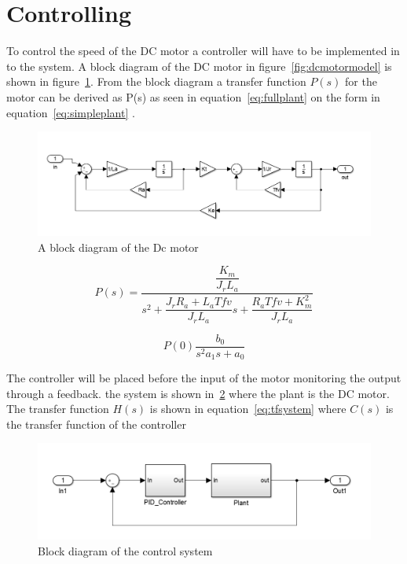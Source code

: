 \section{Controlling}

To control the speed of the DC motor a controller will have to be implemented in to the system. A block diagram of the DC motor in figure~\ref{fig:dcmotormodel} is shown in figure~\ref{fig:dcblock}. From the block diagram a transfer function $P(s)$ for the motor can be derived as P(s) as seen in equation~\ref{eq:fullplant} on the form in equation~\ref{eq:simpleplant} .

\begin{figure}[!h]
	\centering
	\includegraphics[width=.75\linewidth]{graphics/dcblockdiagram}
	\caption{A block diagram of the Dc motor}
	\label{fig:dcblock}
\end{figure}


\begin{equation}
\label{eq:fullplant}
P(s) = \dfrac{\dfrac{K_m}{J_r L_a}}{s^2 + \dfrac{J_r R_a + L_a Tfv}{J_r L_a}s + \dfrac{R_a Tfv +K_m^2}{J_r L_a}}
\end{equation}

\begin{equation}
\label{eq:simpleplant}
P(0) \dfrac{b_0}{s^2 a_1 s + a_0}
\end{equation}


The controller will be placed before the input of the motor monitoring the output through a feedback. the system is shown in~\ref{fig:controlsystem} where the plant is the DC motor. The transfer function $H(s)$ is shown in equation~\ref{eq:tfsystem} where $C(s)$ is the transfer function of the controller
 
\begin{figure}[!h]
	\centering
	\includegraphics[width=.75\linewidth]{graphics/controlsystem}
	\caption{Block diagram of the control system}
	\label{fig:controlsystem}
	
\end{figure}


